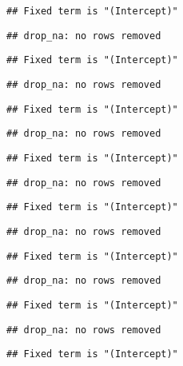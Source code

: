 \documentclass[
]{article}
\begin{document}
\begin{verbatim}
## Fixed term is "(Intercept)"
\end{verbatim}

\begin{verbatim}
## drop_na: no rows removed
\end{verbatim}

\begin{verbatim}
## Fixed term is "(Intercept)"
\end{verbatim}

\begin{verbatim}
## drop_na: no rows removed
\end{verbatim}

\begin{verbatim}
## Fixed term is "(Intercept)"
\end{verbatim}

\begin{verbatim}
## drop_na: no rows removed
\end{verbatim}

\begin{verbatim}
## Fixed term is "(Intercept)"
\end{verbatim}

\begin{verbatim}
## drop_na: no rows removed
\end{verbatim}

\begin{verbatim}
## Fixed term is "(Intercept)"
\end{verbatim}

\begin{verbatim}
## drop_na: no rows removed
\end{verbatim}

\begin{verbatim}
## Fixed term is "(Intercept)"
\end{verbatim}

\begin{verbatim}
## drop_na: no rows removed
\end{verbatim}

\begin{verbatim}
## Fixed term is "(Intercept)"
\end{verbatim}

\begin{verbatim}
## drop_na: no rows removed
\end{verbatim}

\begin{verbatim}
## Fixed term is "(Intercept)"
\end{verbatim}
\end{document}

